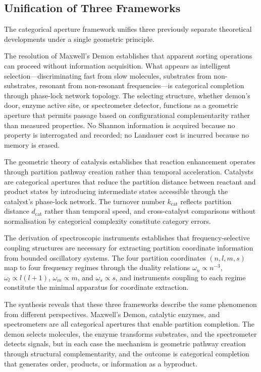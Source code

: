 \documentclass[12pt,a4paper]{article}
\theoremstyle{definition}
\theoremstyle{remark}
\newcommand{\dcat}{d_{\mathrm{cat}}}
\begin{document}
\subsection{Unification of Three Frameworks}

The categorical aperture framework unifies three previously separate theoretical developments under a single geometric principle.

The resolution of Maxwell's Demon establishes that apparent sorting operations can proceed without information acquisition. What appears as intelligent selection---discriminating fast from slow molecules, substrates from non-substrates, resonant from non-resonant frequencies---is categorical completion through phase-lock network topology. The selecting structure, whether demon's door, enzyme active site, or spectrometer detector, functions as a geometric aperture that permits passage based on configurational complementarity rather than measured properties. No Shannon information is acquired because no property is interrogated and recorded; no Landauer cost is incurred because no memory is erased.

The geometric theory of catalysis establishes that reaction enhancement operates through partition pathway creation rather than temporal acceleration. Catalysts are categorical apertures that reduce the partition distance between reactant and product states by introducing intermediate states accessible through the catalyst's phase-lock network. The turnover number $k_{\mathrm{cat}}$ reflects partition distance $\dcat$ rather than temporal speed, and cross-catalyst comparisons without normalisation by categorical complexity constitute category errors.

The derivation of spectroscopic instruments establishes that frequency-selective coupling structures are necessary for extracting partition coordinate information from bounded oscillatory systems. The four partition coordinates $(n, l, m, s)$ map to four frequency regimes through the duality relations $\omega_n \propto n^{-3}$, $\omega_l \propto l(l+1)$, $\omega_m \propto m$, and $\omega_s \propto s$, and instruments coupling to each regime constitute the minimal apparatus for coordinate extraction.

The synthesis reveals that these three frameworks describe the same phenomenon from different perspectives. Maxwell's Demon, catalytic enzymes, and spectrometers are all categorical apertures that enable partition completion. The demon selects molecules, the enzyme transforms substrates, and the spectrometer detects signals, but in each case the mechanism is geometric pathway creation through structural complementarity, and the outcome is categorical completion that generates order, products, or information as a byproduct.
\end{document}
